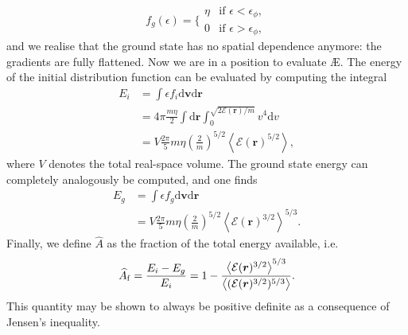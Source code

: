 \begin{equation}
f_g(\epsilon) = 
\Bigg\{
    \begin{array}{lr}
        \eta & \text{if } \epsilon < \epsilon_\phi, \\
        0 &   \text{if } \epsilon > \epsilon_\phi, 
    \end{array}
\end{equation}
and we realise that the ground state has no spatial dependence anymore: the gradients are fully flattened. Now we are in a position to evaluate \AE{}. The energy of the initial distribution function can be evaluated by computing the integral
\begin{equation}
\begin{aligned}
    E_i &= \int \epsilon f_i \mathrm{d} \boldsymbol{v}\mathrm{d} \boldsymbol{r} \\
    &= 4 \pi \frac{m\eta}{2} \int \mathrm{d} \boldsymbol{r}\int_0^{\sqrt{2\mathcal{E}(\boldsymbol{r})/m}} v^4 \mathrm{d}v \\
    &= V \frac{2 \pi}{5} m\eta \left( \frac{2}{m} \right)^{5/2} \left \langle \mathcal{E}(\boldsymbol{r})^{5/2} \right \rangle,
\end{aligned}
\end{equation}
where $V$ denotes the total real-space volume. The ground state energy can completely analogously be computed, and one finds
\begin{equation}
\begin{aligned}
    E_g &= \int \epsilon f_g \mathrm{d} \boldsymbol{v}\mathrm{d} \boldsymbol{r} \\
    &= V \frac{2 \pi}{5} m\eta \left( \frac{2}{m} \right)^{5/2} \left \langle \mathcal{E}(\boldsymbol{r})^{3/2} \right \rangle^{5/3}.
\end{aligned}
\end{equation}
Finally, we define $\widehat{A}$ as the fraction of the total energy available, i.e.
\begin{equation}
    \widehat{A}_{\rm f} = \frac{E_i - E_g}{E_i} = 1 - \frac{\left\langle \mathcal{E}(\boldsymbol{r})^{3/2} \right\rangle^{5/3}}{\left\langle (\mathcal{E}(\boldsymbol{r})^{3/2})^{5/3} \right\rangle}.
    \label{eq: ae-unconstrained}
\end{equation}
This quantity may be shown to always be positive definite as a consequence of Jensen's inequality. 
